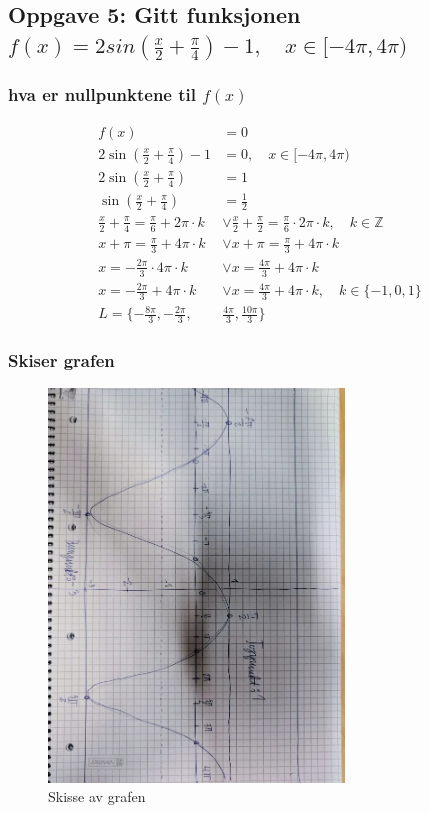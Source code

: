\documentclass{article}
\begin{document}
\subsection{Oppgave 5: Gitt funksjonen $f(x)=2sin(\frac{x}{2}+\frac{\pi}{4})-1, \quad x \in [-4\pi, 4\pi)$}

\subsubsection{hva er nullpunktene til $f(x)$}

\begin{align*}
    f(x) &= 0 \\
    2\sin(\frac{x}{2}+\frac{\pi}{4})-1 &= 0 , \quad x \in [-4\pi, 4\pi)  \\
    2\sin(\frac{x}{2}+\frac{\pi}{4}) &= 1 \\
    \sin(\frac{x}{2}+\frac{\pi}{4}) &= \frac{1}{2} \\
    \frac{x}{2} + \frac{\pi}{4} = \frac{\pi}{6} + 2\pi \cdot k  & \lor \frac{x}{2} + \frac{\pi}{2} = \frac{\pi}{6} \cdot 2\pi \cdot k, \quad k\in\mathbb{Z} \\
    x+\pi=\frac{\pi}{3} + 4\pi \cdot k &\lor x + \pi = \frac{\pi}{3} + 4\pi \cdot k \\
    x=-\frac{2\pi}{3} \cdot 4\pi \cdot k & \lor  x=\frac{4\pi}{3} + 4\pi \cdot k \\
    x=-\frac{2\pi}{3} + 4\pi \cdot k & \lor  x=\frac{4\pi}{3} + 4\pi \cdot k, \quad k \in \{ -1, 0, 1\} \\
    L= \{-\frac{8\pi}{3}, -\frac{2\pi}{3}, & \frac{4\pi}{3}, \frac{10\pi}{3} \}
\end{align*}

\subsubsection{Skiser grafen}

\begin{figure}[h]
    \centering
    \includegraphics[width=0.7\textwidth, angle=90]{tegning.png}
    \caption{Skisse av grafen}
\end{figure}
\end{document}
